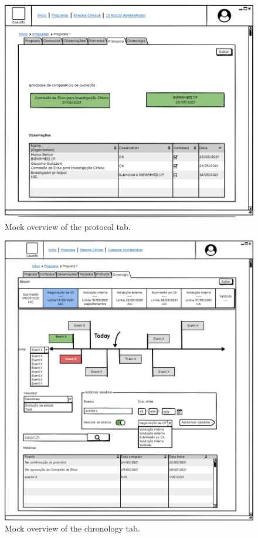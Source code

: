 \begin{figure}[H]
    \centering
    \includegraphics[scale=0.35]{Chapters/img/propostas/proposta-protocolo.png}
    \caption{Mock overview of the protocol tab.}
    \label{fig:proposta-protocolo}
\end{figure}

\begin{figure}[H]
    \centering
    \includegraphics[scale=0.35]{Chapters/img/propostas/proposta-cronologia.png}
    \caption{Mock overview of the chronology tab.}
    \label{fig:proposta-cronologia}
\end{figure}



